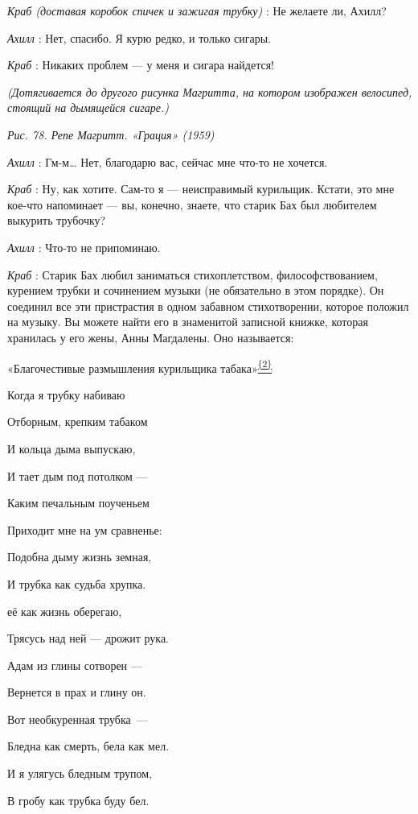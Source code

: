 \documentclass[../main.tex]{subfiles}
\begin{document}
\begin{dialogue}
\emph{Краб (доставая коробок спичек и зажигая трубку)} : Не желаете ли, Ахилл?

\emph{Ахилл} : Нет, спасибо. Я курю редко, и только сигары.

\emph{Краб} : Никаких проблем --- у меня и сигара найдется!

\emph{(Дотягивается до другого рисунка Магритта, на котором изображен велосипед, стоящий на дымящейся сигаре.)}

\emph{Рис. 78. Репе Магритт. «Грация» (1959)}

\emph{Ахилл} : Гм-м\ldots{} Нет, благодарю вас, сейчас мне что-то не хочется.

\emph{Краб} : Ну, как хотите. Сам-то я --- неисправимый курильщик. Кстати, это мне кое-что напоминает --- вы, конечно, знаете, что старик Бах был любителем выкурить трубочку?

\emph{Ахилл} : Что-то не припоминаю.

\emph{Краб} : Старик Бах любил заниматься стихоплетством, философствованием, курением трубки и сочинением музыки (не обязательно в этом порядке). Он соединил все эти пристрастия в одном забавном стихотворении, которое положил на музыку. Вы можете найти его в знаменитой записной книжке, которая хранилась у его жены, Анны Магдалены. Оно называется:

«Благочестивые размышления курильщика табака»\protect\hyperlink{c_2}{\textsuperscript{\uline{\{2\}}}}

Когда я трубку набиваю

Отборным, крепким табаком

И кольца дыма выпускаю,

И тает дым под потолком ---

Каким печальным поученьем

Приходит мне на ум сравненье:

Подобна дыму жизнь земная,

И трубка как судьба хрупка.

её как жизнь оберегаю,

Трясусь над ней --- дрожит рука.

Адам из глины сотворен ---

Вернется в прах и глину он.

Вот необкуренная трубка~---

Бледна как смерть, бела как мел.

И я улягусь бледным трупом,

В гробу как трубка буду бел.


\end{dialogue}
\end{document}
